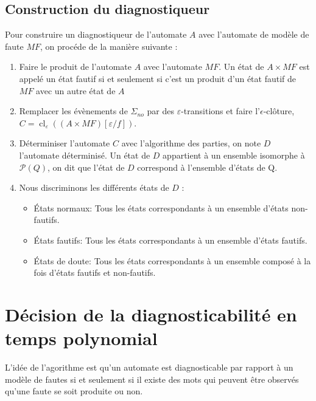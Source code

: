 \documentclass[10pt,a4paper]{article}
\begin{document}
    
    \subsection{Construction du diagnostiqueur}
    Pour construire un diagnostiqueur de l'automate $A$ avec l'automate de mod\`ele de faute $MF$, on proc\'ede de la mani\`ere suivante :
    
    \begin{enumerate}
            \item Faire le produit de l'automate $A$ avec l'automate $MF$. Un \'etat de $A\times MF$ est appel\'e un \'etat fautif si et seulement si c'est un produit d'un \'etat fautif de $MF$ avec un autre \'etat de $A$
            \item Remplacer les \'ev\`enements de $\Sigma_{no}$ par des $\varepsilon$-transitions et faire l'$\epsilon$-cl\^oture, $C = \operatorname{cl}_\varepsilon((A\times MF)[\varepsilon/f])$.
          \item D\'eterminiser l'automate $C$ avec l'algorithme des parties, on note $D$ l'automate d\'eterminis\'e. Un état de $D$ appartient à un ensemble isomorphe à $\mathcal{P}(Q)$, on dit que l'état de $D$ correspond à l'ensemble d'états de Q.
            \item Nous discriminons les diff\'erents \'etats de $D$ :
                    \begin{itemize}
                            \item  \'Etats normaux: Tous les \'etats correspondants à un ensemble d'\'etats non-fautifs.
                           \item \'Etats fautifs:  Tous les \'etats correspondants à un ensemble d'\'etats fautifs.
                            \item \'Etats de doute: Tous les \'etats correspondants à un ensemble composé à la fois d'\'etats fautifs et non-fautifs.
                    \end{itemize}  
                 
    \end{enumerate} 
     

\section{D\'ecision de la diagnosticabilit\'e en temps polynomial}

L'id\'ee de l'agorithme est qu'un automate est diagnosticable par rapport \`a un mod\`ele de fautes si et seulement si il existe des mots qui peuvent être observés qu'une faute se soit produite ou non.
\end{document}
